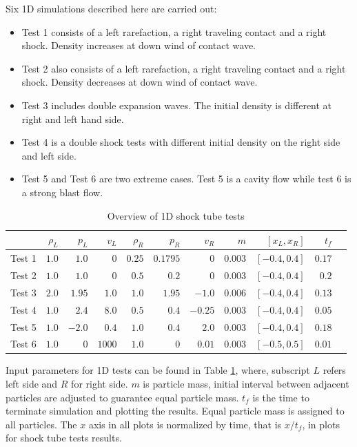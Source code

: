 \documentclass[review]{elsarticle}
\begin{document}
Six 1D simulations described here are carried out:
\begin{itemize}%
\item Test 1 consists of a left rarefaction, a right traveling contact and a right shock. Density increases at down wind of contact wave. 
\item Test 2 also consists of a left rarefaction, a right traveling contact and a right shock. Density decreases at down wind of contact wave. 
\item Test 3 includes double expansion waves. The initial density is different at right and left hand side. 
\item Test 4 is a double shock tests with different initial density on the right side and left side.
\item Test 5 and Test 6 are two extreme cases. Test 5 is a cavity flow while test 6 is a strong blast flow.
\end{itemize}

\begin{table}[H]
\centering
      \caption{Overview of 1D shock tube tests}		
	  \begin{tabular}{lrrrrrrrrrr}
	    \hline
	          & $\rho_L$ & $p_L$ &$v_L$ & $\rho_R$ & $p_R$ &$v_R$ & $m$ & $[x_L, x_R]$ & $t_f$\\
	    \hline
	    Test 1 & $1.0$ & $1.0$ &$0$ & $0.25$ & $0.1795$ &$0$ & $0.003$  & $[-0.4, 0.4]$ & $0.17$\\
	    	Test 2 & $1.0$ & $1.0$ &$0$ & $0.5$ & $0.2$ &$0$ & $0.003$  & $[-0.4, 0.4]$ & $0.2$\\
	    	Test 3 & $2.0$ & $1.95$ &$1.0$ & $1.0$ & $1.95$ &$-1.0$  & $0.006$  & $[-0.4, 0.4]$ & $0.13$\\
	    Test 4 & $1.0$ & $2.4$ &$8.0$ & $0.5$ & $0.4$ &$-0.25$ & $0.003$  & $[-0.4, 0.4]$ & $0.05$\\
	    	Test 5 & $1.0$ & $-2.0$ &$0.4$ & $1.0$ & $0.4$ &$2.0$ & $0.003$  & $[-0.4, 0.4]$ & $0.18$\\
	    	Test 6 & $1.0$ & $0$ &$1000$ & $1.0$ & $0$ &$0.01$ & $0.003$  & $[-0.5, 0.5]$  & $0.01$\\
	    \hline
	  \end{tabular}
	  \label{tab:1D-shock-input_parameters}
\end{table}
Input parameters for 1D tests can be found in Table \ref{tab:1D-shock-input_parameters}, where, subscript $L$ refers left side and $R$ for right side. $m$ is particle mass, initial interval between adjacent particles are adjusted to guarantee equal particle mass. $t_f$ is the time to terminate simulation and plotting the results. Equal particle mass is assigned to all particles. The $x$ axis in all plots is normalized by time, that is $x/t_f$, in plots for shock tube tests results.
\end{document}
